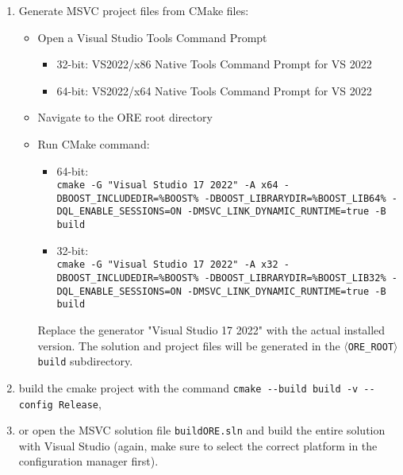 \begin{enumerate}

\item Generate MSVC project files from CMake files:
\begin{itemize}
\item Open a Visual Studio Tools Command Prompt
\begin{itemize}
\item 32-bit: VS2022/x86 Native Tools Command Prompt for VS 2022
\item 64-bit: VS2022/x64 Native Tools Command Prompt for VS 2022
\end{itemize}
\item Navigate to the ORE root directory
\item Run CMake command:
\begin{itemize}
\item 64-bit: \\
{\tt cmake -G "Visual Studio 17 2022" -A x64 -DBOOST\_INCLUDEDIR=\%BOOST\% -DBOOST\_LIBRARYDIR=\%BOOST\_LIB64\% -DQL\_ENABLE\_SESSIONS=ON -DMSVC\_LINK\_DYNAMIC\_RUNTIME=true -B build}
\item 32-bit: \\
{\tt cmake -G "Visual Studio 17 2022" -A x32 -DBOOST\_INCLUDEDIR=\%BOOST\% -DBOOST\_LIBRARYDIR=\%BOOST\_LIB32\% -DQL\_ENABLE\_SESSIONS=ON -DMSVC\_LINK\_DYNAMIC\_RUNTIME=true -B build}
\end{itemize}
Replace the generator "Visual Studio 17 2022" with the actual installed version.
The solution and project files will be generated in the {\tt $\langle$ORE\_ROOT$\rangle${\bs}build} subdirectory.
\end{itemize}

\item build the cmake project with the command {\tt cmake -{}-build build -v -{}-config Release},

\item or open the MSVC solution file {\tt build{\bs}ORE.sln} and build the entire solution with Visual Studio (again, make sure to select the correct platform in the configuration manager first).
\end{enumerate}



